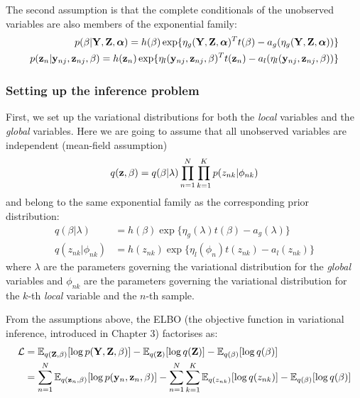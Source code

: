 The second assumption is that the complete conditionals of the unobserved variables are also members of the exponential family:
\begin{align} \label{eq_complete_conditionals} 
	\begin{split}
	p(\beta|{\bf Y},{\bf Z},\mbox{\boldmath $\alpha$}) = h(\beta) \exp\{ \eta_g({\bf Y},{\bf Z},\mbox{\boldmath $\alpha$})^T t(\beta) - a_g(\eta_g({\bf Y},{\bf Z},\mbox{\boldmath $\alpha$})) \} \\
	p({\bf z}_{n}|{\bf y}_{nj},{\bf z}_{nj},\beta) = h({\bf z}_{n}) \exp\{ \eta_l({\bf y}_{nj}, {\bf z}_{nj},\beta)^T t({\bf z}_{n}) - a_l(\eta_l({\bf y}_{nj},{\bf z}_{nj},\beta)) \}
	\end{split} 
\end{align}

\subsubsection{Setting up the inference problem}

 First, we set up the variational distributions for both the \textit{local} variables and the \textit{global} variables. Here we are going to assume that all unobserved variables are independent (mean-field assumption)
\[
	q({\bf z},\beta) = q(\beta|\lambda) \prod_{n=1}^{N} \prod_{k=1}^{K} p(z_{nk}|\phi_{nk})
\]
and belong to the same exponential family as the corresponding prior distribution:
\begin{align} \label{eq_variational_distributions}
	q(\beta|\lambda) &= h(\beta) \exp\{ \eta_g(\lambda) t(\beta) - a_g(\lambda) \} \\
	q(z_{nk}|\phi_{nk}) &= h(z_{nk}) \exp \{ \eta_l(\phi_{n}) t(z_{nk}) - a_l(z_{nk}) \}
\end{align}
where $\lambda$ are the parameters governing the variational distribution for the \textit{global} variables and $\phi_{nk}$ are the parameters governing the variational distribution for the $k$-th \textit{local} variable and the $n$-th sample.

From the assumptions above, the ELBO (the objective function in variational inference, introduced in Chapter 3) factorises as:
\begin{align} \label{eq_elbo_factorised} \begin{split}
	\mathcal{L} &= \mathbb{E}_{q({\bf Z},\beta)}[\log p({\bf Y},{\bf Z},\beta)] - \mathbb{E}_{q({\bf Z})}[\log q({\bf Z})] - \mathbb{E}_{q(\beta)}[\log q(\beta)] \\
	 &= \sum_{n=1}^{N} \mathbb{E}_{q({\bf z}_n,\beta)}[\log p({\bf y}_n,{\bf z}_n,\beta)] - \sum_{n=1}^{N} \sum_{k=1}^{K} \mathbb{E}_{q(z_{nk})}[\log q(z_{nk})] - \mathbb{E}_{q(\beta)}[\log q(\beta)]
\end{split} \end{align}

